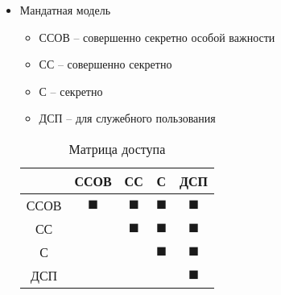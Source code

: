 \begin{itemize}
    \item Мандатная модель

        \begin{itemize}
            \item ССОВ -- совершенно секретно особой важности
            \item СС -- совершенно секретно
            \item С -- секретно
            \item ДСП -- для служебного пользования
        \end{itemize}

        \begin{table}[H]
            \centering
            \caption{Матрица доступа}
            \label{tab:label}
            \begin{tabular}{|c|c|c|c|c|}
                \hline
                & ССОВ & СС & С & ДСП \\
                \hline
                ССОВ & $\blacksquare$ & $\blacksquare$ & $\blacksquare$ & $\blacksquare$ \\
                \hline
                СС & & $\blacksquare$ & $\blacksquare$ & $\blacksquare$ \\
                \hline
                С & & & $\blacksquare$ & $\blacksquare$ \\
                \hline
                ДСП & & & & $\blacksquare$ \\
                \hline
            \end{tabular}
        \end{table}
\end{itemize}
